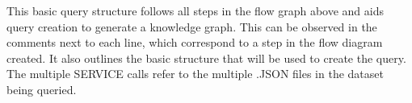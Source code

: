 This basic query structure follows all steps in the flow graph above and aids query creation to generate a knowledge graph. This can be observed in the comments next to each line, which correspond to a step in the flow diagram created. It also outlines the basic structure that will be used to create the query. The multiple SERVICE calls refer to the multiple .JSON files in the dataset being queried. 

